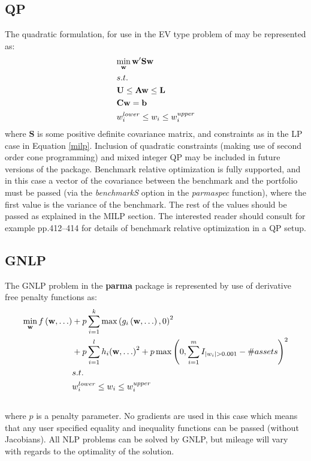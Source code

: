 \subsection{QP}
The quadratic formulation, for use in the EV type problem of
\citet{Markowitz1952} may be represented as:
\begin{equation}\label{qp}
\begin{gathered}
  \mathop {\min }\limits_{\mathbf{w}} {\mathbf{w'Sw}} \hfill \\
  s.t. \hfill \\
  {\mathbf{U}} \leq {\mathbf{Aw}} \leq {\mathbf{L}} \hfill \\
  {\mathbf{Cw}}={\mathbf{b}} \hfill \\
  w_i^{lower} \leq {w_i} \leq w_i^{upper} \hfill \\
\end{gathered}
\end{equation}
where $\mathbf{S}$ is some positive definite covariance matrix, and
constraints as in the LP case in Equation \eqref{milp}. Inclusion of
quadratic constraints (making use of second order cone programming) and mixed
integer QP may be included in future versions of the package. Benchmark relative
optimization is fully supported, and in this case a vector of the covariance
between the benchmark and the portfolio must be passed (via the \emph{benchmarkS}
option in the \emph{parmaspec} function), where the first value is the variance of
the benchmark. The rest of the values should be passed as explained in the MILP
section. The interested reader should consult for example \citet{Stoyanov2007}
pp.412--414 for details of benchmark relative optimization in a QP setup.

\subsection{GNLP}
The GNLP problem in the \textbf{parma} package is represented by use of
derivative free penalty functions as:
\begin{align}
\mathop{\min }\limits_{\mathbf{w}}f\left( {{\mathbf{w}},\dots} \right) & +
{p}\sum\limits_{i=1}^k {\max {{\left( {{g_i}\left( {{\mathbf{w}},\dots}
\right),0} \right)}^2}}\\ \nonumber
& + {p}\sum\limits_{i=1}^l {{h_i}{{\left( {{\mathbf{w}}, \ldots } \right)}^2}}
+ {p}\max {\left( {0,\sum\limits_{i=1}^m {{I_{\left| {{w_i}} \right| > 0.001}} - \# assets} } \right)^2}\\
&s.t.\hfill \\ \nonumber
&w_i^{lower} \leq {w_i} \leq w_i^{upper}\\ \nonumber
\end{align}
where $p$ is a penalty parameter. No gradients are used in this case which means that
any user specified equality and inequality functions can be passed (without Jacobians).
All NLP problems can be solved by GNLP, but mileage will vary with regards to the optimality
of the solution.

